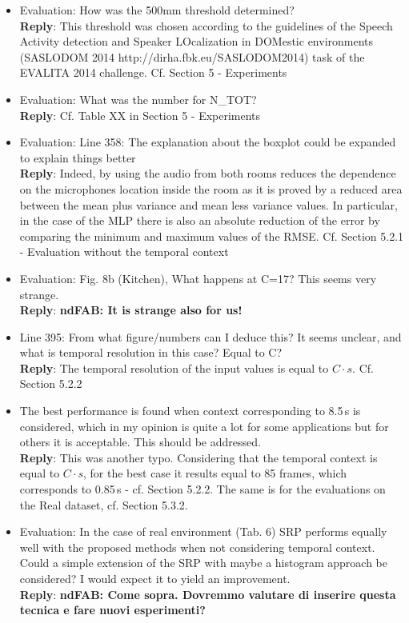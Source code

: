 \documentclass[11pt, technote, letterpaper, oneside, onecolumn]{IEEEtran}
\begin{document}
\begin{itemize}
\item Evaluation: How was the 500mm threshold determined?\\
\textbf{Reply}: This threshold was chosen according to the guidelines of the Speech Activity detection and Speaker LOcalization in DOMestic environments (SASLODOM 2014 http://dirha.fbk.eu/SASLODOM2014) task of the EVALITA 2014 challenge. Cf. Section 5 - Experiments

\item Evaluation: What was the number for N\_TOT?\\
\textbf{Reply}: Cf. Table XX in Section 5 - Experiments

\item Evaluation: Line 358: The explanation about the boxplot could be expanded to explain things better\\
\textbf{Reply}: Indeed, by using the audio from both rooms reduces the dependence on the microphones location inside the room as it is proved by a reduced area between the mean plus variance and mean less variance values. In particular, in the case of the MLP there is also an absolute reduction of the error by comparing the minimum and maximum values of the RMSE. Cf. Section 5.2.1 - Evaluation without the temporal context

\item Evaluation: Fig. 8b (Kitchen), What happens at C=17? This seems very strange.\\
\textbf{Reply}: \textbf{ndFAB: It is strange also for us!}

\item Line 395: From what figure/numbers can I deduce this? It seems unclear, and what is temporal resolution in this case? Equal to C?\\
\textbf{Reply}: The temporal resolution of the input values is equal to $C\cdot s$. Cf. Section 5.2.2 

\item The best performance is found when context corresponding to 8.5\,s is considered, which in my opinion is quite a lot for some applications but for others it is acceptable. This should be addressed.\\
\textbf{Reply}:  This was another typo. Considering that the temporal context is equal to $C\cdot s$, for the best case it results equal to 85 frames, which corresponds to 0.85\,s - cf. Section 5.2.2. The same is for the evaluations on the Real dataset, cf. Section 5.3.2.

\item Evaluation: In the case of real environment (Tab. 6) SRP performs equally well with the proposed methods when not considering temporal context. Could a simple extension of the SRP with maybe a histogram approach be considered? I would expect it to yield an improvement.\\
\textbf{Reply}: \textbf{ndFAB: Come sopra. Dovremmo valutare di inserire questa tecnica e fare nuovi esperimenti?}


\end{itemize}
\end{document}
